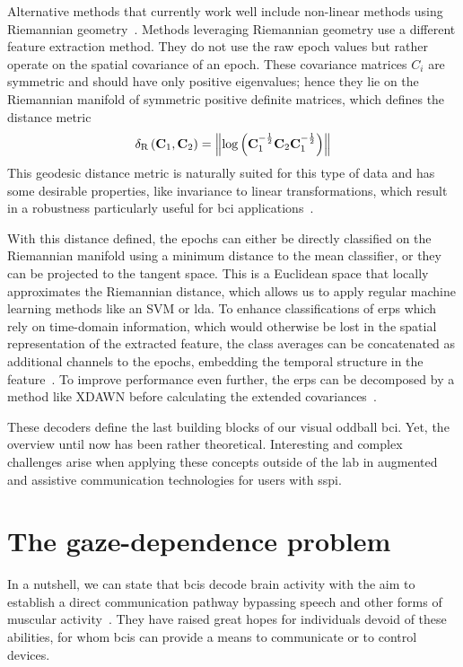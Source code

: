 Alternative methods that currently work well include non-linear methods using Riemannian
geometry~\cite{Barachant2014}.
Methods leveraging Riemannian geometry use a different feature extraction method.
They do not use the raw epoch values but rather operate on the spatial covariance of an
epoch.
These covariance matrices $C_i$ are symmetric and should have only positive eigenvalues;
hence they lie on the Riemannian manifold of symmetric positive definite matrices, which
defines the distance metric
\begin{equation}
  \delta_\text{R}\left(\mathbf{C}_1,\mathbf{C}_2\right)
  =\left\lVert\log\left(\mathbf{C}_1^{-\frac{1}{2}} \mathbf{C}_2 \mathbf{C}_1^{-\frac{1}{2}}\right)\right\rVert
\end{equation}
This geodesic distance metric is naturally suited for this type of data and has some
desirable properties, like invariance to linear transformations, which result in a
robustness particularly useful for \ac{bci} applications~\cite{Barachant2011}.

With this distance defined, the epochs can either be directly classified on the
Riemannian manifold using a minimum distance to the mean classifier, or they can be
projected to the tangent space.
This is a Euclidean space that locally approximates the Riemannian distance, which
allows us to apply regular machine learning methods like an SVM or \ac{lda}.
To enhance classifications of \acp{erp} which rely on time-domain information, which
would otherwise be lost in the spatial representation of the extracted feature, the
class averages can be concatenated as additional channels to the epochs, embedding the
temporal structure in the feature~\cite{Barachant2014}.
To improve performance even further, the \acp{erp} can be decomposed by a method like
XDAWN before calculating the extended covariances~\cite{Li2020}.

These decoders define the last building blocks of our visual oddball \ac{bci}.
Yet, the overview until now has been rather theoretical.
Interesting and complex challenges arise when applying these concepts outside of the lab
in augmented and assistive communication technologies for users with \acl{sspi}.

\section{The gaze-dependence problem}

In a nutshell, we can state that \acp{bci} decode brain activity with the aim to
establish a direct communication pathway bypassing speech and other forms of muscular
activity~\cite{Naci2012,Chaudhary2016}.
They have raised great hopes for individuals devoid of these abilities, for whom
\acp{bci} can provide a means to communicate or to control devices.

